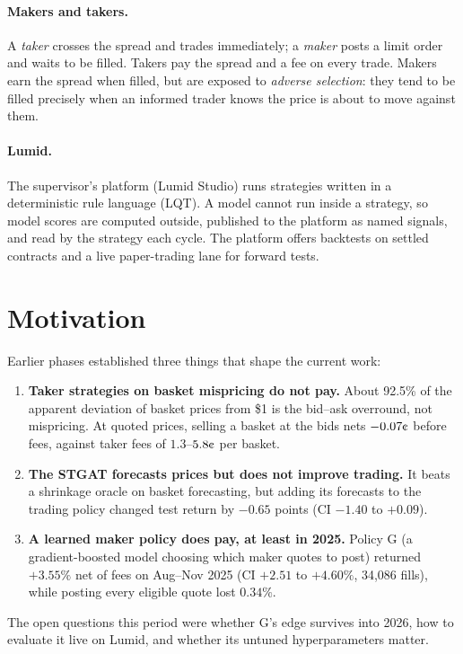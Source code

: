 \documentclass[11pt,a4paper]{article}
\newcommand{\cent}{\text{\textcent}}
\begin{document}
\paragraph{Makers and takers.} A \emph{taker} crosses the spread and trades immediately; a \emph{maker} posts a
limit order and waits to be filled. Takers pay the spread and a fee on every trade. Makers earn the spread when
filled, but are exposed to \emph{adverse selection}: they tend to be filled precisely when an informed trader
knows the price is about to move against them.

\paragraph{Lumid.} The supervisor's platform (Lumid Studio) runs strategies written in a deterministic rule
language (LQT). A model cannot run inside a strategy, so model scores are computed outside, published to the
platform as named signals, and read by the strategy each cycle. The platform offers backtests on settled
contracts and a live paper-trading lane for forward tests.

\section{Motivation}

Earlier phases established three things that shape the current work:
\begin{enumerate}
  \item \textbf{Taker strategies on basket mispricing do not pay.} About 92.5\% of the apparent deviation of basket
        prices from \$1 is the bid--ask overround, not mispricing. At quoted prices, selling a basket at the bids
        nets $-0.07\cent$ before fees, against taker fees of $1.3$--$5.8\cent$ per basket.
  \item \textbf{The STGAT forecasts prices but does not improve trading.} It beats a shrinkage oracle on basket
        forecasting, but adding its forecasts to the trading policy changed test return by $-0.65$ points
        (CI $-1.40$ to $+0.09$).
  \item \textbf{A learned maker policy does pay, at least in 2025.} Policy G (a gradient-boosted model choosing
        which maker quotes to post) returned $+3.55\%$ net of fees on Aug--Nov 2025 (CI $+2.51$ to $+4.60\%$,
        34,086 fills), while posting every eligible quote lost $0.34\%$.
\end{enumerate}
The open questions this period were whether G's edge survives into 2026, how to evaluate it live on Lumid, and
whether its untuned hyperparameters matter.
\end{document}
